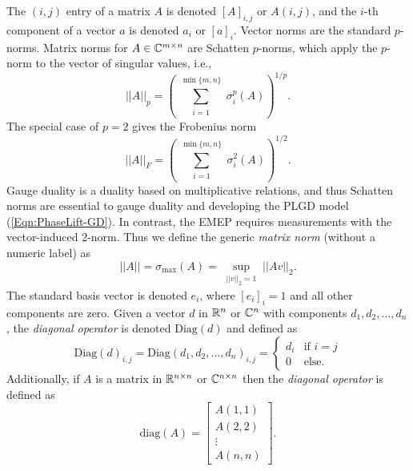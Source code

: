 The $(i,j)$ entry of a matrix $A$ is denoted $[A]_{i,j}$ or $A(i,j)$, and the $i$-th component of a vector $a$ is denoted $a_i$ or $[a]_i$.  Vector norms are the standard $p$-norms.   Matrix norms for $A \in {\mathbb C}^{m \times n}$ are Schatten $p$-norms, which apply the  $p$-norm to the vector of singular values, i.e.,
\begin{equation}  \label{Def:shatten_norms}
||A||_p  = \left( \sum_{\substack{i = 1}}^{\substack{\min\{m, n \}}} \sigma_i^p(A) \right)^{1/p}.
\end{equation}
The special case of $p = 2$ gives the Frobenius norm
\begin{equation} 	\label{Def:Frobenius_norm}
||A||_F = \left(   \sum_{\substack{i = 1}}^{\substack{\min\{m, n \}}} \sigma_i^2(A)  \right)^{1/2}.
\end{equation}
Gauge duality is a duality based on multiplicative relations, and thus Schatten norms are essential to gauge duality and developing the PLGD model (\ref{Eqn:PhaseLift-GD}).  In contrast, the EMEP requires measurements with the vector-induced $2$-norm.  Thus we define the generic \textit{matrix norm} (without a numeric label) as
\begin{equation} 		\label{Def:matrix_norm}
||A|| = \sigma_{\max}(A) = \sup_{\substack{||v||_2 = 1}} ||Av||_2.
\end{equation}
The standard basis vector is denoted $e_i$, where $[e_i]_i = 1$ and all other components are zero.  
Given a vector $d$ in ${\mathbb R}^n$ or ${\mathbb C}^n$ with components $d_1, d_2, \ldots, d_n$, the \textit{diagonal operator} is denoted $\text{Diag}(d)$ and defined as
\begin{equation}
\text{Diag}(d)_{i,j} = \text{Diag}(d_1, d_2, \ldots, d_n)_{i,j} = 
	\begin{cases}
		d_i 		&		\text{if } i = j	\\
		0		&	\text{else}.
	\end{cases}
\end{equation}
Additionally, if $A$ is a matrix in ${\mathbb R}^{n \times n}$ or ${\mathbb C}^{n \times n}$ then the \textit{diagonal operator} is defined as
\begin{equation}
\text{diag}(A) = 
	\begin{bmatrix}
		A(1,1)	\\
		A(2,2)	\\
		\vdots	\\
		A(n,n)
	\end{bmatrix}.
\end{equation}

